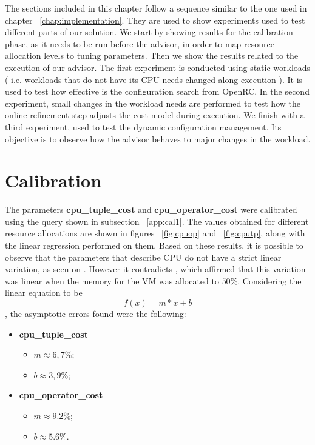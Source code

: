 The sections included in this chapter follow a sequence similar to the one used in chapter ~\ref{chap:implementation}. They are used to show experiments used to test different parts of our solution. We start by showing results for the calibration phase, as it needs to be run before the advisor, in order to map resource allocation levels to tuning parameters. Then we show the results related to the execution of our advisor. The first experiment is conducted using static workloads ( i.e. workloads that do not have its CPU needs changed along execution ). It is used to test how effective is the configuration search from OpenRC. In the second experiment, small changes in the workload needs are performed to test how the online refinement step adjusts the cost model during execution. We finish with a third experiment, used to test the dynamic configuration management. Its objective is to observe how the advisor behaves to major changes in the workload.


\section{Calibration}

The parameters \textbf{cpu\_tuple\_cost} and \textbf{cpu\_operator\_cost} were calibrated using the query shown in subsection ~\ref{app:cal1}. The values obtained for different resource allocations are shown in figures ~\ref{fig:cpuop} and ~\ref{fig:cputp}, along with the linear regression performed on them. Based on these results, it is possible to observe that the parameters that describe CPU do not have a strict linear variation, as seen on  \cite{4401021}. However it contradicts  \cite{Soror:2008:AVM:1376616.1376711}, which affirmed that this variation was linear when the memory for the VM was allocated to $50\%$. Considering the linear equation to be
\[
 f(x) = m*x + b
\],
the asymptotic errors found were the following:
\begin{itemize}
 \item \textbf{cpu\_tuple\_cost}
 \begin{itemize}
  \item $m \approx 6,7\% $;
  \item $b \approx 3,9\% $;
 \end{itemize}
  \item \textbf{cpu\_operator\_cost}
 \begin{itemize}
  \item $m \approx 9.2\% $;
  \item $b \approx 5.6\% $.
 \end{itemize}
\end{itemize}

